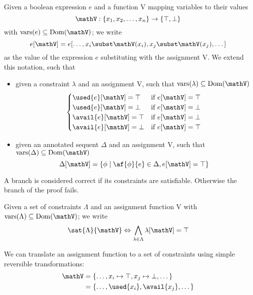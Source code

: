 \begin{define}[Evaluation]
	Given a boolean expression $e$ and a function V mapping variables to their values 
	$$ \mathV : \{ x_1, x_2, \dots, x_n \} \rightarrow \{ \top, \bot \} $$
	with $\mathrm{vars}(e) \subseteq \mathrm{Dom}(\mathV)$; we write
		$$ e[\mathV] = e[\dots, x_i \subst \mathV(x_i), x_j \subst \mathV(x_j), \dots] $$
	as the value of the expression $e$ substituting with the assignment V.
	We extend this notation, such that
	\begin{itemize}
		\item given a constraint $\lambda$ and an assignment V, such that $\mathrm{vars}(\lambda) \subseteq \mathrm{Dom}(\mathV)$
			$$ 
			\begin{cases} 
				\used{e}[\mathV] = \top & \text{if } e[\mathV] = \top \\
				\used{e}[\mathV] = \bot & \text{if } e[\mathV] = \bot \\
				\avail{e}[\mathV] = \top & \text{if } e[\mathV] = \bot \\
				\avail{e}[\mathV] = \bot & \text{if } e[\mathV] = \top \\
			\end{cases}
			$$
		\item given an annotated sequent $\Delta$ and an assignment V, such that $\mathrm{vars}(\Delta) \subseteq \mathrm{Dom}(\mathV)$
			$$ \Delta[\mathV] = \{ \phi \mid \af{\phi}{e} \in \Delta , e[\mathV] = \top \} $$
	\end{itemize}
\end{define}
A branch is considered correct if its constraints are satisfiable.
Otherwise the branch of the proof fails.
\begin{define}
	\label{def:sat}
	Given a set of constraints $\Lambda$ and an assignment function V with $\mathrm{vars}(\Lambda) \subseteq \mathrm{Dom}(\mathV)$; we write 
	$$ \sat{\Lambda}{\mathV} \Leftrightarrow \bigwedge_{\lambda \in \Lambda} \lambda[\mathV] = \top $$
\end{define}
\begin{fact}
	\label{fact:ass-trans}
	We can translate an assignment function to a set of constraints using simple reversible transformations:
	\begin{align*}
		\mathV &= \{ \dots, x_i \mapsto \top, x_j \mapsto \bot, \dots \} \\
		       &= \{ \dots, \used{x_i}, \avail{x_j}, \dots \}
	\end{align*}
\end{fact}

